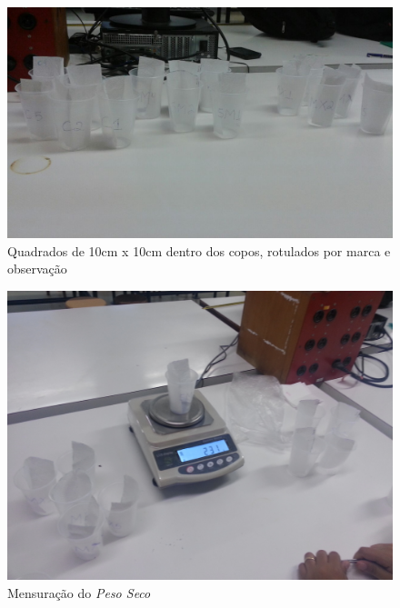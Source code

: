 \documentclass[a4paper,12pt,notitlepage]{article}
\begin{document}
\begin{figure}[!htb]
    \centering
    \includegraphics[scale = 0.27]{foto1}
    \caption{Quadrados de 10cm x 10cm dentro dos copos, rotulados por marca e observação}
    \label{fig:foto1}
\end{figure}

\begin{figure}
    \centering
    \includegraphics[scale=0.11]{foto2}
    \caption{Mensuração do \textit{Peso Seco}}
    \label{fig:foto2}
\end{figure}
\end{document}
